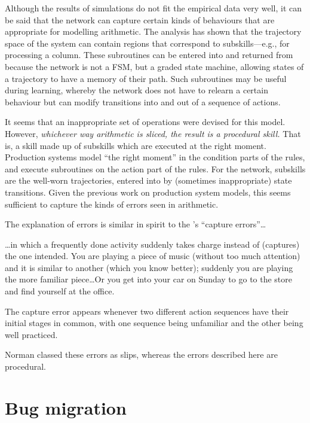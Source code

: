 Although the results of simulations do not fit the empirical data very
well,
it can
be said that the network can capture certain kinds of behaviours that are
appropriate for modelling arithmetic.
The analysis has shown that the trajectory space of the system can contain
regions that correspond to subskills---e.g.,  for processing a column.
These subroutines can be entered into and returned from because
the network is not a FSM, but a graded state machine, allowing
states of a trajectory to have a memory of their path.
Such subroutines may be useful during learning, whereby the network
does not have to relearn a certain behaviour but can modify transitions
into and out of a sequence of actions.

It seems that an inappropriate set of operations
were devised for this model. However, {\em whichever way arithmetic is
sliced, the result is
a procedural skill.}  That is, a skill made up of subskills which are
executed at the right moment.  Production systems model ``the right
moment'' in the condition parts of the rules, and execute subroutines on
the action part of the rules.  For the network, subskills are the well-worn
trajectories, entered into by (sometimes inappropriate) state
transitions.  Given the previous work on production system models,
this seems sufficient to capture the kinds of errors seen in arithmetic.


The explanation of errors is similar in spirit to the
\citeauthor{normpsyc}'s ``capture errors''\ldots
\begin{ssquote}
\ldots in which a frequently done activity suddenly takes charge instead of
(captures) the one intended.  You are playing a piece of music (without too
much attention) and it is similar to another (which you know better);
suddenly you are playing the more familiar piece\ldots Or you get into your
car on Sunday to go to the store and find yourself at the office.

The capture error appears whenever two different action sequences have
their initial stages in common, with one sequence being unfamiliar and the
other being well practiced.

\hfill \cite[p.~107]{normpsyc}
\end{ssquote}

Norman classed these errors as slips, whereas the errors described
here are procedural.


\section{Bug migration}

